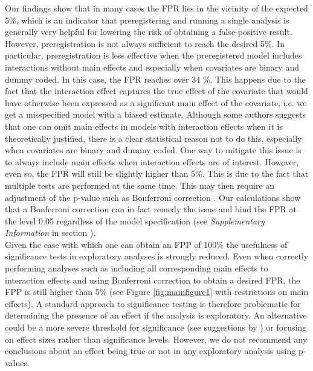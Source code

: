 Our findings show that in many cases the FPR lies in the vicinity of the expected 5\%, which is an indicator that preregistering and running a single analysis is generally very helpful for lowering the risk of obtaining a false-positive result. However, preregistration is not always sufficient to reach the desired 5\%. In particular, preregistration is less effective when the preregistered model includes interactions without main effects and especially when covariates are binary and dummy coded. In this case, the FPR reaches over 34 \%. This happens due to the fact that the interaction effect captures the true effect of the covariate that would have otherwise been expressed as a significant main effect of the covariate, i.e. we get a misspecified model with a biased estimate. Although some authors suggests that one can omit main effects in models with interaction effects when it is theoretically justified, there is a clear statistical reason not to do this, especially when covariates are binary and dummy coded. One way to mitigate this issue is to always include main effects when interaction effects are of interest. However, even so, the FPR will still be slightly higher than 5\%. This is due to the fact that multiple tests are performed at the same time. This may then require an adjustment of the p-value such as Bonferroni correction \citep{dunn1961multiple}. Our calculations show that a Bonferroni correction can in fact remedy the issue and bind the FPR at the level 0.05 regardless of the model specification (see \textit{Supplementary Information} in section ).  \\

Given the ease with which one can obtain an FPP of 100\% the usefulness of significance tests in exploratory analyses is strongly reduced. Even when correctly performing analyses such as including all corresponding main effects to interaction effects and using Bonferroni correction to obtain a desired FPR, the FPP is still higher than 5\% (see Figure \ref{fig:mainfigure1} with restrictions on main effects). A standard approach to significance testing is therefore problematic for determining the presence of an effect if the analysis is exploratory. An alternative could be a more severe threshold for significance (see suggestions by \cite{benjamin2018}) or focusing on effect sizes rather than significance levels. However, we do not recommend any conclusions about an effect being true or not in any exploratory analysis using p-values.  
    
